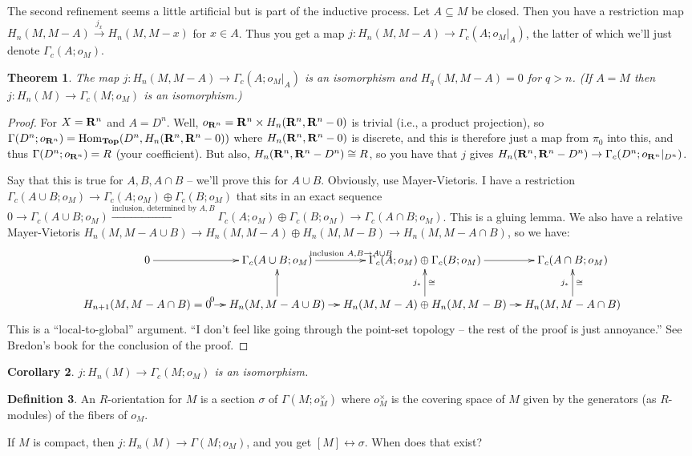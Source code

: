 \documentclass{amsart}
\theoremstyle{theorem}
\newtheorem{theorem}{Theorem}[section]
\newtheorem{corollary}[theorem]{Corollary}
\theoremstyle{definition}
\newtheorem{definition}[theorem]{Definition}
\DeclareMathOperator{\Hom}{Hom}
\begin{document}
The second refinement seems a little artificial but is part of the inductive process. Let $A\subseteq M$ be closed. Then you have a restriction map $H_n(M,M-A)\xrightarrow{j_x}H_n(M,M-x)$ for $x\in A$. Thus you get a map $j:H_n(M,M-A)\to \Gamma_c(A;o_M|_{A})$, the latter of which we'll just denote $\Gamma_c(A;o_M)$.
\begin{theorem}
The map $j:H_n(M,M-A)\to \Gamma_c(A;o_M|_{A})$ is an isomorphism and $H_q(M,M-A)=0$ for $q>n$. (If $A=M$ then $j:H_n(M)\to \Gamma_c(M;o_M)$ is an isomorphism.)
\end{theorem}
\begin{proof}
For $X=\mathbf R^n$ and $A=D^n$. Well, $o_{\mathbf R^n}=\mathbf R^n\times H_n(\mathbf R^n,\mathbf R^n-0)$ is trivial (i.e., a product projection), so $\Gamma(D^n;o_{\RR^n})=\Hom_{\mathbf{Top}}(D^n,H_n(\RR^n,\RR^n-0))$ where $H_n(\mathbf R^n,\mathbf R^n-0)$ is discrete, and this is therefore just a map from $\pi_0$ into this, and thus $\Gamma(D^n;o_{\mathbf R^n})=R$ (your coefficient). But also, $H_n(\mathbf R^n,\mathbf R^n-D^n)\cong R$, so you have that $j$ gives $H_n(\mathbf R^n,\mathbf R^n-D^n)\to \Gamma_c(D^n;o_{\mathbf R^n}|_{D^n})$.

Say that this is true for $A,B,A\cap B$ -- we'll prove this for $A\cup B$. Obviously, use Mayer-Vietoris. I have a restriction $\Gamma_c(A\cup B;o_M)\to \Gamma_c(A;o_M)\oplus \Gamma_c(B;o_M)$ that sits in an exact sequence $0\to \Gamma_c(A\cup B;o_M)\xrightarrow{\text{inclusion, determined by }A,B} \Gamma_c(A;o_M)\oplus \Gamma_c(B;o_M)\to \Gamma_c(A\cap B;o_M)$. This is a gluing lemma. We also have a relative Mayer-Vietoris $H_n(M,M-A\cup B)\to H_n(M,M-A)\oplus H_n(M,M-B)\to H_n(M,M-A\cap B)$, so we have:
\begin{align*}
\xymatrix@C=10pt{
	0\ar[r] & \Gamma_c(A\cup B;o_M)\ar[r]^{\text{inclusion }A,B\to A\cup B} & \Gamma_c(A;o_M)\oplus \Gamma_c(B;o_M)\ar[r] & \Gamma_c(A\cap B;o_M)\\
	H_{n+1}(M,M-A\cap B)=0\ar[r]^0 & H_n(M,M-A\cup B)\ar[r]\ar[u] & H_n(M,M-A)\oplus H_n(M,M-B)\ar[r]\ar[u]^{j_\ast}_{\cong} & H_n(M,M-A\cap B)\ar[u]^{j_\ast}_{\cong}
}
\end{align*}
This is a ``local-to-global'' argument. ``I don't feel like going through the point-set topology -- the rest of the proof is just annoyance.'' See Bredon's book for the conclusion of the proof.
\end{proof}
\begin{corollary}
$j:H_n(M)\to \Gamma_c(M;o_M)$ is an isomorphism.
\end{corollary}
\begin{definition}
An $R$-orientation for $M$ is a section $\sigma$ of $\Gamma(M;o_M^\times)$ where $o_M^\times$ is the covering space of $M$ given by the generators (as $R$-modules) of the fibers of $o_M$.
\end{definition}
If $M$ is compact, then $j:H_n(M)\to \Gamma(M;o_M)$, and you get $[M]\leftrightarrow \sigma$. When does that exist?
\end{document}
